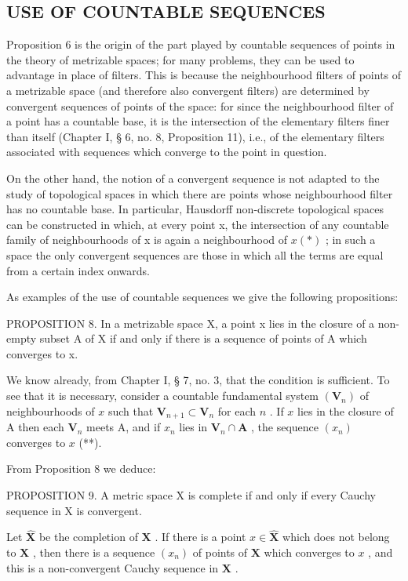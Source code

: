 \subsection{USE OF COUNTABLE SEQUENCES}

Proposition 6 is the origin of the part played by countable sequences of points in the theory of metrizable spaces; for many problems, they can be used to advantage in place of filters. This is because the neighbourhood filters of points of a metrizable space (and therefore also convergent filters) are determined by convergent sequences of points of the space: for since the neighbourhood filter of a point has a countable base, it is the intersection of the elementary filters finer than itself (Chapter I, § 6, no. 8, Proposition 11), i.e., of the elementary filters associated with sequences which converge to the point in question.

On the other hand, the notion of a convergent sequence is not adapted to the study of topological spaces in which there are points whose neighbourhood filter has no countable base. In particular, Hausdorff non-discrete topological spaces can be constructed in which, at every point x, the intersection of any countable family of neighbourhoods of x is again a neighbourhood of \(x (*)\) ; in such a space the only convergent sequences are those in which all the terms are equal from a certain index onwards.

As examples of the use of countable sequences we give the following propositions:

PROPOSITION 8. In a metrizable space X, a point x lies in the closure of a non-empty subset A of X if and only if there is a sequence of points of A which converges to x.

We know already, from Chapter I, § 7, no. 3, that the condition is sufficient. To see that it is necessary, consider a countable fundamental system \((\mathbf{V}_n)\) of neighbourhoods of \(x\) such that \(\mathbf{V}_{n+1} \subset \mathbf{V}_n\) for each \(n\) . If \(x\) lies in the closure of A then each \(\mathbf{V}_n\) meets A, and if \(x_n\) lies in \(\mathbf{V}_n \cap \mathbf{A}\) , the sequence \((x_n)\) converges to \(x\) (**).

From Proposition 8 we deduce:

PROPOSITION 9. A metric space X is complete if and only if every Cauchy sequence in X is convergent.

Let \(\hat{\mathbf{X}}\) be the completion of \(\mathbf{X}\) . If there is a point \(x \in \hat{\mathbf{X}}\) which does not belong to \(\mathbf{X}\) , then there is a sequence \((x_n)\) of points of \(\mathbf{X}\) which converges to \(x\) , and this is a non-convergent Cauchy sequence in \(\mathbf{X}\) .

